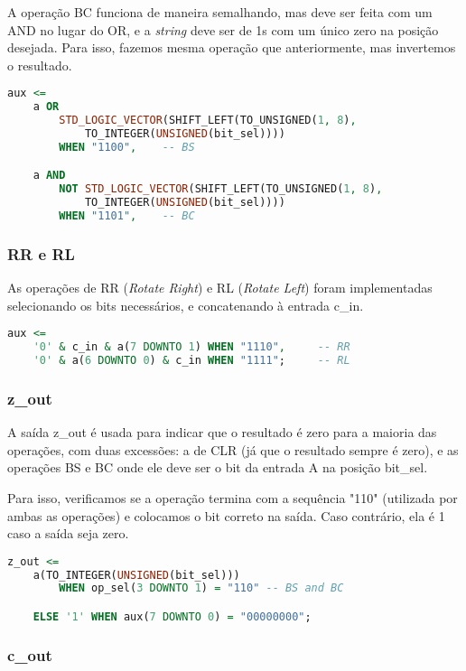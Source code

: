 \documentclass{article}
\begin{document}
A operação BC funciona de maneira semalhando, mas deve ser feita com um AND no lugar do OR, e a \textit{string} deve ser de 1s com um único zero na posição desejada. Para isso, fazemos mesma operação que anteriormente, mas invertemos o resultado.

\begin{lstlisting}[language=VHDL]
aux <=
    a OR
        STD_LOGIC_VECTOR(SHIFT_LEFT(TO_UNSIGNED(1, 8),
            TO_INTEGER(UNSIGNED(bit_sel))))
        WHEN "1100",    -- BS

    a AND
        NOT STD_LOGIC_VECTOR(SHIFT_LEFT(TO_UNSIGNED(1, 8),
            TO_INTEGER(UNSIGNED(bit_sel))))
        WHEN "1101",	-- BC
\end{lstlisting}

\subsubsection{RR e RL}

As operações de RR (\textit{Rotate Right}) e RL (\textit{Rotate Left}) foram implementadas selecionando os bits necessários, e concatenando à entrada c\_in.

\begin{lstlisting}[language=VHDL]
aux <=
    '0' & c_in & a(7 DOWNTO 1) WHEN "1110",     -- RR
    '0' & a(6 DOWNTO 0) & c_in WHEN "1111";     -- RL
\end{lstlisting}

\subsubsection{z\_out}

A saída z\_out é usada para indicar que o resultado é zero para a maioria das operações, com duas excessões: a de CLR (já que o resultado sempre é zero), e as operações BS e BC onde ele deve ser o bit da entrada A na posição bit\_sel.

Para isso, verificamos se a operação termina com a sequência "110" (utilizada por ambas as operações) e colocamos o bit correto na saída. Caso contrário, ela é 1 caso a saída seja zero.

\begin{lstlisting}[language=VHDL]
z_out <=
    a(TO_INTEGER(UNSIGNED(bit_sel)))
        WHEN op_sel(3 DOWNTO 1) = "110" -- BS and BC

    ELSE '1' WHEN aux(7 DOWNTO 0) = "00000000";
\end{lstlisting}

\subsubsection{c\_out}
\end{document}

